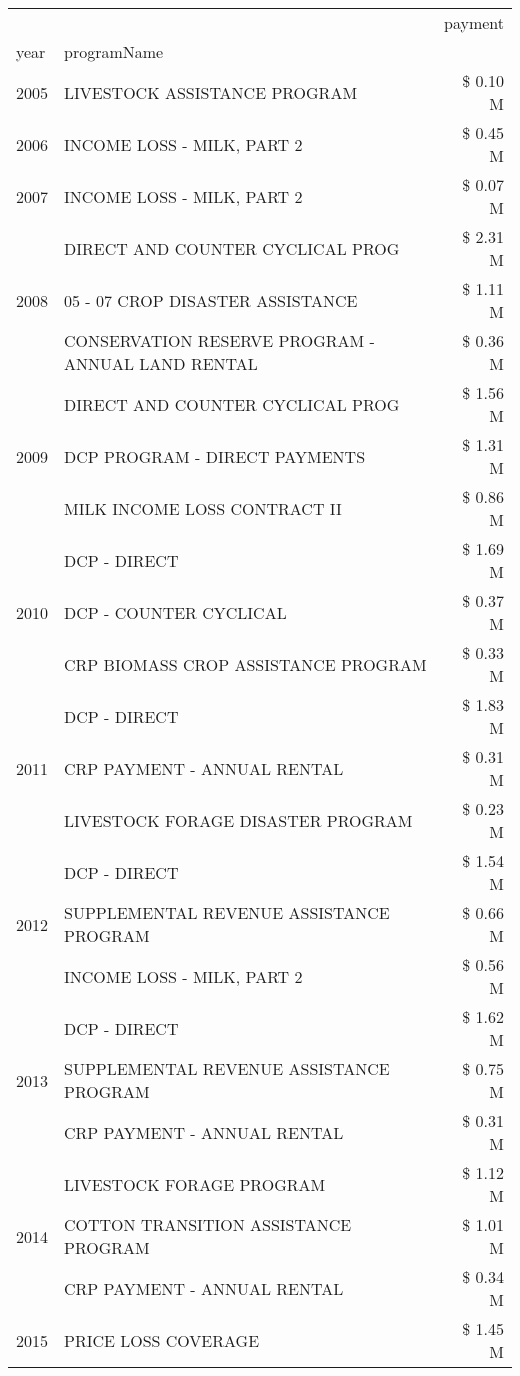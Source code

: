 \begin{tabular}{llr}
\toprule
 &  & payment \\
year & programName &  \\
\midrule
2005 & LIVESTOCK ASSISTANCE PROGRAM & \$ 0.10 M \\
\cline{1-3}
2006 & INCOME LOSS - MILK, PART 2 & \$ 0.45 M \\
\cline{1-3}
2007 & INCOME LOSS - MILK, PART 2 & \$ 0.07 M \\
\cline{1-3}
\multirow[t]{3}{*}{2008} & DIRECT AND COUNTER CYCLICAL PROG & \$ 2.31 M \\
 & 05 - 07 CROP DISASTER ASSISTANCE & \$ 1.11 M \\
 & CONSERVATION RESERVE PROGRAM - ANNUAL LAND RENTAL & \$ 0.36 M \\
\cline{1-3}
\multirow[t]{3}{*}{2009} & DIRECT AND COUNTER CYCLICAL PROG & \$ 1.56 M \\
 & DCP PROGRAM - DIRECT PAYMENTS & \$ 1.31 M \\
 & MILK INCOME LOSS CONTRACT II & \$ 0.86 M \\
\cline{1-3}
\multirow[t]{3}{*}{2010} & DCP - DIRECT & \$ 1.69 M \\
 & DCP - COUNTER CYCLICAL & \$ 0.37 M \\
 & CRP BIOMASS CROP ASSISTANCE PROGRAM & \$ 0.33 M \\
\cline{1-3}
\multirow[t]{3}{*}{2011} & DCP - DIRECT & \$ 1.83 M \\
 & CRP PAYMENT - ANNUAL RENTAL & \$ 0.31 M \\
 & LIVESTOCK FORAGE DISASTER PROGRAM & \$ 0.23 M \\
\cline{1-3}
\multirow[t]{3}{*}{2012} & DCP - DIRECT & \$ 1.54 M \\
 & SUPPLEMENTAL REVENUE ASSISTANCE PROGRAM & \$ 0.66 M \\
 & INCOME LOSS - MILK, PART 2 & \$ 0.56 M \\
\cline{1-3}
\multirow[t]{3}{*}{2013} & DCP - DIRECT & \$ 1.62 M \\
 & SUPPLEMENTAL REVENUE ASSISTANCE PROGRAM & \$ 0.75 M \\
 & CRP PAYMENT - ANNUAL RENTAL & \$ 0.31 M \\
\cline{1-3}
\multirow[t]{3}{*}{2014} & LIVESTOCK FORAGE PROGRAM & \$ 1.12 M \\
 & COTTON TRANSITION ASSISTANCE PROGRAM & \$ 1.01 M \\
 & CRP PAYMENT - ANNUAL RENTAL & \$ 0.34 M \\
\cline{1-3}
\multirow[t]{3}{*}{2015} & PRICE LOSS COVERAGE & \$ 1.45 M \\

\end{tabular}
